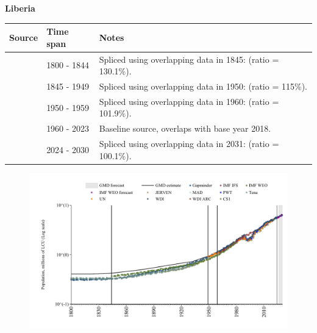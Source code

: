 \documentclass[12pt,a4paper,landscape]{article}
\begin{document}
\begin{adjustbox}{max totalsize={\paperwidth}{\paperheight},center}
\begin{minipage}[t][\textheight][t]{\textwidth}
\vspace*{0.5cm}
{}
\begin{center}
{\Large\bfseries Liberia}
\end{center}
\vspace{0.5cm}
\begin{table}[H]
\centering
\small
\begin{tabular}{|l|l|l|}
\hline
\textbf{Source} & \textbf{Time span} & \textbf{Notes} \\
\hline
\rowcolor{white}\cite{Gapminder}& 1800 - 1844 &Spliced using overlapping data in 1845: (ratio = 130.1\%).\\
\rowcolor{lightgray}\cite{CS1_LBR}& 1845 - 1949 &Spliced using overlapping data in 1950: (ratio = 115\%).\\
\rowcolor{white}\cite{IMF_IFS}& 1950 - 1959 &Spliced using overlapping data in 1960: (ratio = 101.9\%).\\
\rowcolor{lightgray}\cite{WDI}& 1960 - 2023 &Baseline source, overlaps with base year 2018.\\
\rowcolor{white}\cite{Gapminder}& 2024 - 2030 &Spliced using overlapping data in 2031: (ratio = 100.1\%).\\
\hline
\end{tabular}
\end{table}
\begin{figure}[H]
\centering
\includegraphics[width=\textwidth,height=0.6\textheight,keepaspectratio]{graphs/LBR_pop.pdf}
\end{figure}
\end{minipage}
\end{adjustbox}
\end{document}

